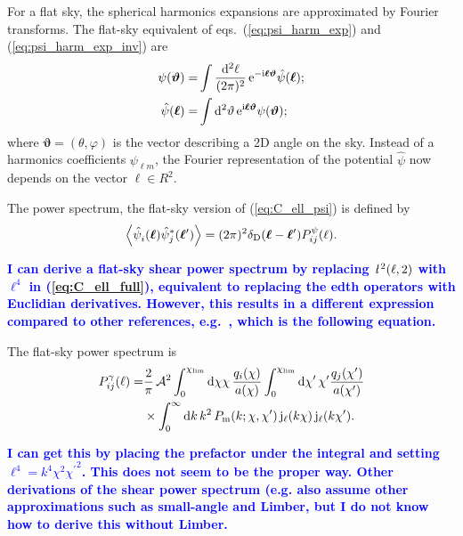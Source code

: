\documentclass[useAMS,usenatbib]{mn2e} %
\newcommand{\ellbar}{\hbox{\it \l}\,}
\newcommand{\pref}{{\cal A}}
\renewcommand{\vec}{\bm}
\newcommand{\mk}[1]{{\bf\textcolor{blue}{#1}}}
\begin{document}
For a flat sky, the spherical harmonics expansions are approximated by Fourier
transforms. The flat-sky equivalent of eqs.~(\ref{eq:psi_harm_exp}) and
(\ref{eq:psi_harm_exp_inv}) are
%
\begin{align}
  \psi(\vec \vartheta) = & \int \frac{{\rm d}^2 \ell}{(2\pi)^2} \, {\rm e}^{-{\rm i} \vec \ell \vec \vartheta} \hat \psi(\vec \ell);
  \label{eq:psi_fourier}
  \\
  \hat \psi(\vec \ell) = & \int {\rm d}^2 \vartheta \, {\rm e}^{{\rm i} \vec \ell \vec \vartheta} \psi(\vec \vartheta);
  \label{eq:psi_fourier_inv}
\end{align}
%
where $\vec \vartheta = (\theta, \varphi)$ is the vector describing a 2D angle on the sky.
Instead of a harmonics coefficients $\psi_{\ell m}$, the Fourier representation of the potential
$\hat \psi$ now depends on the vector $\vec \ell \in R^2$.

The power spectrum, the flat-sky version of
(\ref{eq:C_ell_psi}) is defined by
%
\begin{equation}
  \left\langle \hat \psi_i^{}(\vec \ell) \hat \psi_j^\ast(\vec \ell^\prime) \right\rangle
    = (2\pi)^2 \delta_{\rm D}(\vec \ell - \vec \ell^\prime) P^\psi_{ij}(\ell).
  \label{eq:P_ell_psi}
\end{equation}


\mk{I can derive a flat-sky shear power spectrum by replacing $\ellbar^2(\ell, 2)$ with $\ell^4$
in (\ref{eq:C_ell_full}), equivalent to replacing the edth operators with Euclidian derivatives.
However, this results in a different expression compared to other references, e.g.~\cite{2008PhRvD..78d3002S},
which is the following equation.}

The flat-sky power spectrum is
%
\begin{align}
  P_{ij}^\gamma(\ell) = & \frac 2 \pi \, \pref^2
                 \int_{0}^{\chi_{\rm lim}} {\rm d} \chi \chi \, \frac{q_i(\chi)}{a(\chi)}
                \int_{0}^{\chi_{\rm lim}} {\rm d} \chi^\prime\, \chi^\prime
                \frac{q_j(\chi^\prime)}{a(\chi^\prime)}
                \nonumber \\
                & \times \int_0^\infty {\rm d} k \, k^2 \, P_{\rm m}(k; \chi, \chi^\prime) \,
                {\rm j}_\ell(k \chi) \, {\rm j}_\ell(k \chi^\prime) .
  \label{eq:P_ell_gamma}
\end{align}
%

\mk{I can get this by placing the prefactor under the integral and
setting $\ell^4 = k^4 \chi^2 {\chi^\prime}^2$. This does not seem to be the proper way.
Other derivations of the shear power spectrum (e.g.\cite{BS01} also assume other approximations
such as small-angle and Limber, but I do not know how to derive this without Limber.}
\end{document}
